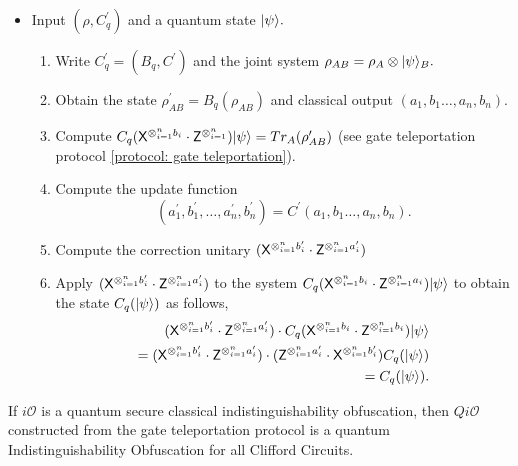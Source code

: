 \begin{algorithm}[H]
 \begin{itemize}
  \item Input $\left(\rho,C_q^\prime \right)$ and a quantum state ${\lvert}\psi\rangle.$
  \begin{enumerate}
  \item   Write $C_q^\prime=(B_q, C^\prime)$ and the joint system $\rho_{AB}=\rho_A\otimes {\lvert}\psi\rangle_B.$
  \item   Obtain the state $\rho_{AB}^\prime=B_q(\rho_{AB})$ and classical output $(a_1,b_1\ldots,a_n,b_n).$ 
  \item   Compute $C_q({\sf X}^{\otimes_{i=1}^{n} b_{i}} \cdot {\sf Z}^{\otimes_{i=1}^{n}}){\lvert}\psi\rangle=Tr_A(\rho_{AB}^\prime)$ (see  gate teleportation protocol \ref{protocol: gate teleportation}).
  \item   Compute the update function $$(a_1^\prime, b_1^\prime,\ldots, a_n^\prime, b_n^\prime)=C^\prime(a_1,b_1\ldots,a_n,b_n).$$
  \item    Compute the correction unitary $({\sf X}^{\otimes_{i=1}^{n} b_{i}^\prime} \cdot {\sf Z}^{\otimes_{i=1}^{n} a_{i}^\prime})$ 
  \item   Apply  $({\sf X}^{\otimes_{i=1}^{n} b_{i}^\prime} \cdot {\sf Z}^{\otimes_{i=1}^{n} a_{i}^\prime})$ to the system $C_q({\sf X}^{\otimes_{i=1}^{n} b_{i}} \cdot {\sf Z}^{\otimes_{i=1}^{n} a_{i}}){\lvert}\psi\rangle$ to obtain the state $C_q({\lvert}\psi\rangle)$ as follows,
  \begin{equation*}
  \begin{aligned}
 ({\sf X}^{\otimes_{i=1}^{n} b_{i}^\prime} \cdot {\sf Z}^{\otimes_{i=1}^{n} a_{i}^\prime}) \cdot C_q({\sf X}^{\otimes_{i=1}^{n} b_{i}} \cdot {\sf Z}^{\otimes_{i=1}^{n}b_{i}}){\lvert}\psi\rangle\\
 =({\sf X}^{\otimes_{i=1}^{n} b_{i}^\prime} \cdot {\sf Z}^{\otimes_{i=1}^{n} a_{i}^\prime}) \cdot ({\sf Z}^{\otimes_{i=1}^{n} a_{i}^\prime} \cdot {\sf X}^{\otimes_{i=1}^{n}b_{i}^\prime})C_q({\lvert}\psi\rangle)\\
 = C_q({\lvert}\psi\rangle).
 \end{aligned}
 \end{equation*}
  \end{enumerate}
  \end{itemize}
\end{algorithm}

\begin{theorem}
If $i\mathcal{O}$ is a quantum secure classical indistinguishability obfuscation, then $Qi\mathcal{O}$ constructed from the gate teleportation protocol is a quantum Indistinguishability Obfuscation for all Clifford Circuits.
\end{theorem}

